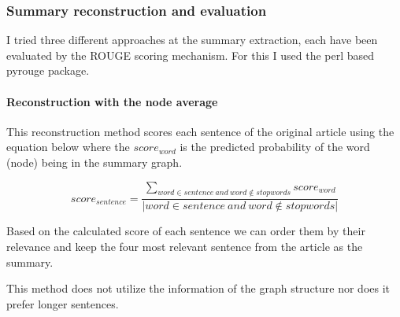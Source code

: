 \subsubsection{Summary reconstruction and evaluation}
I tried three different approaches at the summary extraction, each have been evaluated by the ROUGE scoring mechanism. For this I used the perl based pyrouge package.

\paragraph{Reconstruction with the node average}

This reconstruction method scores each sentence of the original article using the equation below where the \(score_{word}\) is the predicted probability of the word (node) being in the summary graph.

\[score_{sentence} = \frac{\sum_{word \in sentence\ and\ word \notin stopwords} score_{word}}{|word \in sentence\ and\ word \notin stopwords|}\]

Based on the calculated score of each sentence we can order them by their relevance and keep the four most relevant sentence from the article as the summary.

This method does not utilize the information of the graph structure nor does it prefer longer sentences.

